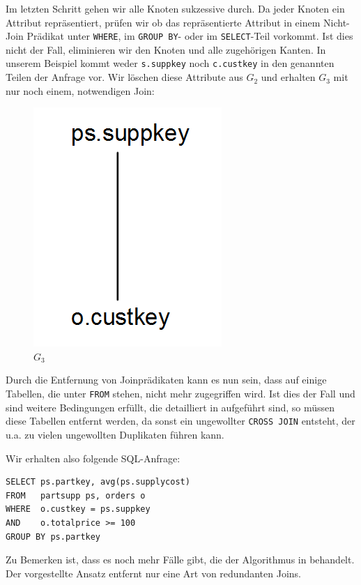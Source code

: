 Im letzten Schritt gehen wir alle Knoten sukzessive durch. Da jeder Knoten ein Attribut repräsentiert, prüfen wir ob das repräsentierte Attribut in einem Nicht-Join Prädikat unter \verb|WHERE|, im \verb|GROUP BY|- oder im \verb|SELECT|-Teil vorkommt. Ist dies nicht der Fall, eliminieren wir den Knoten und alle zugehörigen Kanten. In unserem Beispiel kommt weder \verb|s.suppkey| noch \verb|c.custkey| in den genannten Teilen der Anfrage vor. Wir löschen diese Attribute aus $G_2$ und erhalten $G_3$ mit nur noch einem, notwendigen Join:

\begin{figure}[h]
\includegraphics[scale=0.4]{Bilder/joinelem_g3.png}
\caption{$G_3$}
\end{figure}

Durch die Entfernung von Joinprädikaten kann es nun sein, dass auf einige Tabellen, die unter \verb|FROM| stehen, nicht mehr zugegriffen wird. Ist dies der Fall und sind weitere Bedingungen erfüllt, die detailliert in \cite{joinelem2} aufgeführt sind, so müssen diese Tabellen entfernt werden, da sonst ein ungewollter \verb|CROSS JOIN| entsteht, der u.a. zu vielen ungewollten Duplikaten führen kann.

Wir erhalten also folgende SQL-Anfrage:

\begin{lstlisting}[mathescape]
SELECT ps.partkey, avg(ps.supplycost)
FROM   partsupp ps, orders o
WHERE  o.custkey = ps.suppkey 
AND    o.totalprice >= 100
GROUP BY ps.partkey
\end{lstlisting}

Zu Bemerken ist, dass es noch mehr Fälle gibt, die der Algorithmus in \cite{joinelem2} behandelt. Der vorgestellte Ansatz entfernt nur eine Art von redundanten Joins. 

